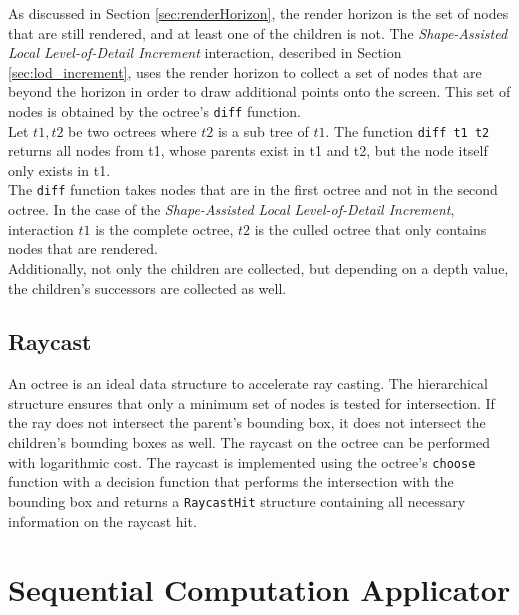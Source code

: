 As discussed in Section \ref{sec:renderHorizon}, the render horizon is the set of nodes that are still rendered, and at least one of the children is not. The \textit{Shape-Assisted Local Level-of-Detail Increment} interaction, described in Section \ref{sec:lod_increment}, uses the render horizon to collect a set of nodes that are beyond the horizon in order to draw additional points onto the screen. This set of nodes is obtained by the octree's \verb|diff| function. 
\\
Let $t1, t2$ be two octrees where $t2$ is a sub tree of $t1$. The function \verb|diff t1 t2| returns all nodes from t1, whose parents exist in t1 and t2, but the node itself only exists in t1.
\\
The \verb|diff| function takes nodes that are in the first octree and not in the second octree. In the case of the \textit{Shape-Assisted Local Level-of-Detail Increment}, interaction $t1$ is the complete octree, $t2$ is the culled octree that only contains nodes that are rendered. 
\\
Additionally, not only the children are collected, but depending on a depth value, the children's successors are collected as well. 


\subsection{Raycast}

An octree is an ideal data structure to accelerate ray casting. The hierarchical structure ensures that only a minimum set of nodes is tested for intersection. If the ray does not intersect the parent's bounding box, it does not intersect the children's bounding boxes as well. The raycast on the octree can be performed with logarithmic cost. The raycast is implemented using the octree's \verb|choose| function with a decision function that performs the intersection with the bounding box and returns a \verb|RaycastHit| structure containing all necessary information on the raycast hit. 


\section{Sequential Computation Applicator}

